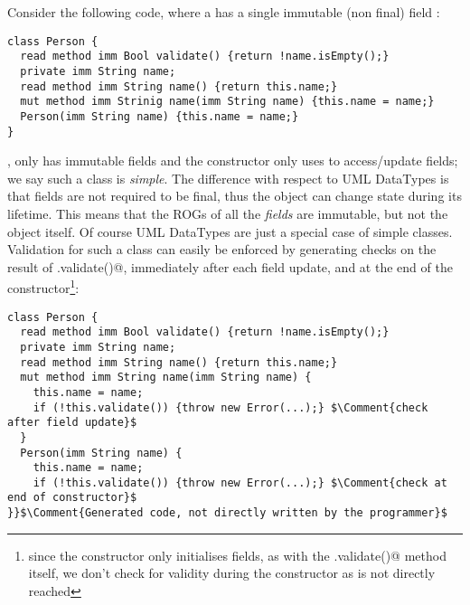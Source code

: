  Consider the following code, where a \Q@Person@ has a single immutable (non final) field \Q@name@:
\begin{lstlisting}
class Person {
  read method imm Bool validate() {return !name.isEmpty();}
  private imm String name;
  read method imm String name() {return this.name;}
  mut method imm Strinig name(imm String name) {this.name = name;}
  Person(imm String name) {this.name = name;}
}
\end{lstlisting}
\Q@Person@, only has immutable fields and the constructor only uses \Q@this@ to access/update fields; we say such a class is \emph{simple}.
The difference with respect to UML DataTypes 
 is that fields are not required to be final, thus the object can change state during its lifetime. This means that the ROGs of all the \emph{fields} are immutable, but not the object itself.
Of course UML DataTypes
 are just a special case of simple classes.
Validation for such a class can easily be enforced by generating checks on the result of \Q@.validate()@, immediately after each field update, and at the end of the constructor\footnote{since the constructor only initialises fields, as with the \Q@.validate()@ method itself, we don't check for validity during the constructor as \Q@this@ is not directly reached}:

\begin{lstlisting}
class Person {
  read method imm Bool validate() {return !name.isEmpty();}
  private imm String name;
  read method imm String name() {return this.name;}
  mut method imm String name(imm String name) {
    this.name = name;
    if (!this.validate()) {throw new Error(...);} $\Comment{check after field update}$
  }
  Person(imm String name) {
    this.name = name;
    if (!this.validate()) {throw new Error(...);} $\Comment{check at end of constructor}$
}}$\Comment{Generated code, not directly written by the programmer}$
\end{lstlisting}

